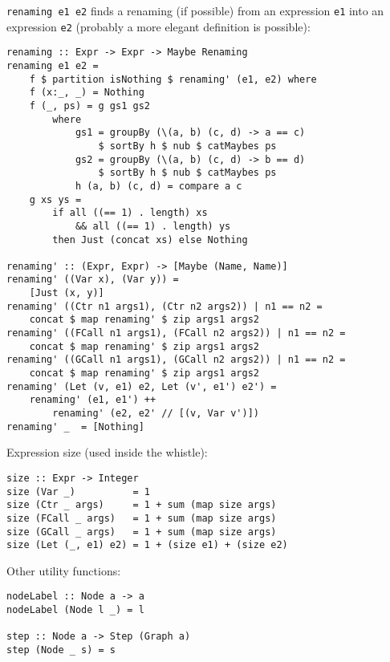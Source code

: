 \texttt{renaming e1 e2} finds a renaming (if possible) from an expression \texttt{e1} 
into an expression \texttt{e2}
(probably a more elegant definition is possible):
\begin{lstlisting}[name=datautil]
renaming :: Expr -> Expr -> Maybe Renaming
renaming e1 e2 = 
	f $ partition isNothing $ renaming' (e1, e2) where
	f (x:_, _) = Nothing
	f (_, ps) = g gs1 gs2
		where
			gs1 = groupBy (\(a, b) (c, d) -> a == c) 
				$ sortBy h $ nub $ catMaybes ps
			gs2 = groupBy (\(a, b) (c, d) -> b == d) 
				$ sortBy h $ nub $ catMaybes ps
			h (a, b) (c, d) = compare a c
	g xs ys = 
		if all ((== 1) . length) xs 
			&& all ((== 1) . length) ys
		then Just (concat xs) else Nothing

renaming' :: (Expr, Expr) -> [Maybe (Name, Name)]
renaming' ((Var x), (Var y)) =
	[Just (x, y)]
renaming' ((Ctr n1 args1), (Ctr n2 args2)) | n1 == n2 =
	concat $ map renaming' $ zip args1 args2
renaming' ((FCall n1 args1), (FCall n2 args2)) | n1 == n2 =
	concat $ map renaming' $ zip args1 args2
renaming' ((GCall n1 args1), (GCall n2 args2)) | n1 == n2 =
	concat $ map renaming' $ zip args1 args2
renaming' (Let (v, e1) e2, Let (v', e1') e2') =
	renaming' (e1, e1') ++ 
		renaming' (e2, e2' // [(v, Var v')])
renaming' _  = [Nothing]
\end{lstlisting}
Expression size (used inside the whistle):
\begin{lstlisting}[name=datautil]
size :: Expr -> Integer
size (Var _)          = 1
size (Ctr _ args)     = 1 + sum (map size args)
size (FCall _ args)   = 1 + sum (map size args)
size (GCall _ args)   = 1 + sum (map size args)
size (Let (_, e1) e2) = 1 + (size e1) + (size e2)
\end{lstlisting}
Other utility functions:
\begin{lstlisting}[name=datautil]
nodeLabel :: Node a -> a
nodeLabel (Node l _) = l

step :: Node a -> Step (Graph a)
step (Node _ s) = s
\end{lstlisting}